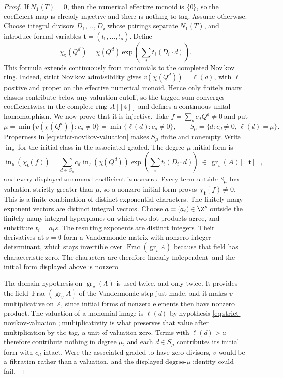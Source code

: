 \begin{proof}
If \(N_1(T)=0\), then the numerical effective monoid is \(\{0\}\), so the
coefficient map is already injective and there is nothing to tag.  Assume
otherwise.
Choose integral divisors \(D_1,\ldots,D_\rho\) whose pairings separate
\(N_1(T)\), and introduce formal variables
\(\boldsymbol t=(t_1,\ldots,t_\rho)\).  Define
\[
 \chi_{\boldsymbol t}(Q^d)=\chi(Q^d)
 \exp\!\left(\sum_i t_i(D_i\cdot d)\right).
 \label{eq:divisor-tagging-map}
\]
This formula extends continuously from monomials to the completed Novikov
ring.  Indeed, strict Novikov admissibility gives
\(v(\chi(Q^d))=\ell(d)\), with \(\ell\) positive and proper on the
effective numerical monoid.  Hence only finitely many classes contribute
below any valuation cutoff, so the tagged sum converges coefficientwise in
the complete ring \(A[[\boldsymbol t]]\) and defines a continuous unital
homomorphism.  We now prove that it is injective.  Take
\(f=\sum_d c_dQ^d\ne0\) and put
\[
 \mu=\min\{v(\chi(Q^d)):c_d\ne0\}
     =\min\{\ell(d):c_d\ne0\},
 \qquad
 S_\mu=\{d:c_d\ne0,\ \ell(d)=\mu\}.
 \label{eq:divisor-tagging-initial-support}
\]
Properness in \eqref{eq:strict-novikov-valuation} makes \(S_\mu\) finite
and nonempty.  Write \(\operatorname{in}_v\) for the initial class in the
associated graded.  The degree-\(\mu\) initial form is
\[
 \operatorname{in}_\mu\!\left(\chi_{\boldsymbol t}(f)\right)
 =\sum_{d\in S_\mu}c_d\operatorname{in}_v\!\left(\chi(Q^d)\right)
 \exp\!\left(\sum_i t_i(D_i\cdot d)\right)
 \ \in\ \operatorname{gr}_v(A)[[\boldsymbol t]],
 \label{eq:divisor-tagging-initial-form}
\]
and every displayed summand coefficient is nonzero.  Every term outside \(S_\mu\) has valuation
strictly greater than \(\mu\), so a nonzero initial form proves
\(\chi_{\boldsymbol t}(f)\ne0\).  This is a finite combination of distinct
exponential characters.  The finitely many exponent vectors are distinct
integral vectors.  Choose \(a=(a_i)\in\Z^\rho\) outside the finitely many
integral hyperplanes on which two dot products agree, and substitute
\(t_i=a_i s\).  The resulting exponents are distinct integers.  Their
derivatives at \(s=0\) form a Vandermonde matrix with nonzero integer
determinant, which stays invertible over
\(\operatorname{Frac}(\operatorname{gr}_v A)\) because that field has
characteristic zero.  The characters are therefore linearly independent, and
the initial form displayed above is nonzero.

The domain hypothesis on \(\operatorname{gr}_v(A)\) is used twice, and only
twice.  It provides the field \(\operatorname{Frac}(\operatorname{gr}_v A)\)
of the Vandermonde step just made, and it makes \(v\) multiplicative on
\(A\), since initial forms of nonzero elements then have nonzero product.  The
valuation of a monomial image is \(\ell(d)\) by hypothesis
\eqref{eq:strict-novikov-valuation}; multiplicativity is what preserves that
value after multiplication by the tag, a unit of valuation zero.  Terms with
\(\ell(d)>\mu\) therefore contribute nothing in degree \(\mu\), and each
\(d\in S_\mu\) contributes its initial form with \(c_d\) intact.  Were the
associated graded to have zero divisors, \(v\) would be a filtration rather
than a valuation, and the displayed degree-\(\mu\) identity could fail.


\end{proof}
